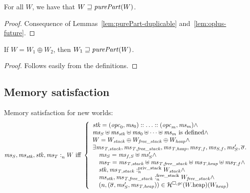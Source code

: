 \documentclass[a4paper]{article}
\begin{document}
\begin{lemma}
  \label{lem:world-fut-purePart}
  For all $W$, we have that $W \future \purePart{W}$.
\end{lemma}
\begin{proof}
  Consequence of Lemmas~\ref{lem:purePart-duplicable}
  and~\ref{lem:oplus-future}.
\end{proof}

\begin{lemma}
  \label{lem:auth-partial-betterthannothing}
  If $W = W_1 \oplus W_2$, then $W_1 \future \purePart{W}$.
\end{lemma}
\begin{proof}
  Follows easily from the definitions.
\end{proof}

\subsection{Memory satisfaction}
Memory satisfaction for new worlds:
\[
  \mathit{ms}_S,\mathit{ms}_{\mathit{stk}},\mathit{stk},\mathit{ms}_T :_{n}^{}W \text{ iff } 
  \left\{
    \begin{array}{l}
      \mathit{stk} = (\mathit{opc}_0,\mathit{ms}_0):: \dots :: (\mathit{opc}_m,\mathit{ms}_m) \wedge \\
      \mathit{ms}_S \uplus \mathit{ms}_{\mathit{stk}} \uplus \mathit{ms}_0 \uplus \dots \uplus \mathit{ms}_m  \text{ is defined} \wedge\\
      W = W_{\mathit{stack}} \oplus W_{\mathit{free\_stack}} \oplus W_{\mathit{heap}} \wedge\\
      \exists \mathit{ms}_{\mathit{T,stack}}, \mathit{ms}_{\mathit{T,free\_stack}}, \mathit{ms}_{\mathit{T,heap}}, \mathit{ms}_{T,f}, \mathit{ms}_{S,f}, \mathit{ms}_S',\overline{\sigma}\ldotp \\
      \quad \mathit{ms}_S = \mathit{ms}_{f,S} \uplus \mathit{ms}_S' \wedge \\
      \quad \mathit{ms}_T = \mathit{ms}_{\mathit{T,stack}} \uplus \mathit{ms}_{\mathit{T,free\_stack}} \uplus \mathit{ms}_{\mathit{T,heap}} \uplus \mathit{ms}_{T,f} \wedge \\

      \quad \mathit{stk},\mathit{ms}_{\mathit{T,stack}} :_{n}^{\text{priv\_stack}}W_{\mathit{stack}} \wedge \\
      \quad \mathit{ms}_{\mathit{stk}},\mathit{ms}_{\mathit{T,free\_stack}} :_{n}^{\text{free\_stack}}W_{\mathit{free\_stack}} \wedge \\
      \quad \left(n,(\overline{\sigma},\mathit{ms}_S',\mathit{ms}_{\mathit{T,heap}})\right) \in \mathcal{H}^{\square,\mathit{gc}}(W.\mathrm{heap})(W_{\mathit{heap}})
    \end{array}
  \right.
\]
\end{document}
